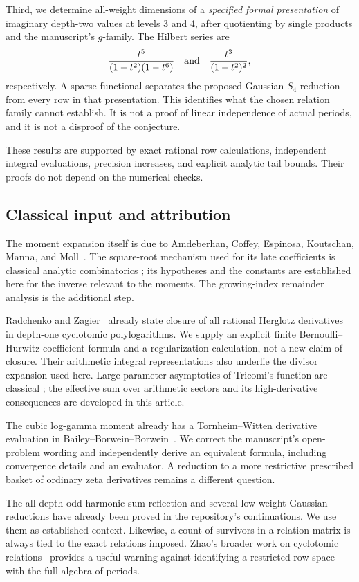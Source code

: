 Third, we determine all-weight dimensions of a \emph{specified formal
presentation} of imaginary depth-two values at levels 3 and 4, after
quotienting by single products and the manuscript's \(g\)-family.
The Hilbert series are
\[
 \frac{t^5}{(1-t^2)(1-t^6)}
 \quad\hbox{and}\quad
 \frac{t^3}{(1-t^2)^2},
\]
respectively. A sparse functional separates the proposed Gaussian
\(S_4\) reduction from every row in that presentation. This identifies
what the chosen relation family cannot establish. It is not a proof of
linear independence of actual periods, and it is not a disproof of the
conjecture.

These results are supported by exact rational row calculations,
independent integral evaluations, precision increases, and explicit
analytic tail bounds. Their proofs do not depend on the numerical
checks.

\subsection{Classical input and attribution}

The moment expansion itself is due to Amdeberhan, Coffey, Espinosa,
Koutschan, Manna, and Moll~\cite{ACEMKM}. The square-root mechanism used
for its late coefficients is classical analytic combinatorics
\cite{FS}; its hypotheses and the constants are established here for
the inverse relevant to the moments. The growing-index remainder
analysis is the additional step.

Radchenko and Zagier~\cite{RZ} already state closure of all rational
Herglotz derivatives in depth-one cyclotomic polylogarithms. We supply
an explicit finite Bernoulli--Hurwitz coefficient formula and a
regularization calculation, not a new claim of closure. Their arithmetic
integral representations also underlie the divisor expansion used here.
Large-parameter asymptotics of Tricomi's function are classical
\cite{DLMF,Temme}; the effective sum over arithmetic sectors and its
high-derivative consequences are developed in this article.

The cubic log-gamma moment already has a Tornheim--Witten derivative
evaluation in Bailey--Borwein--Borwein~\cite{BBB}. We correct the
manuscript's open-problem wording and independently derive an equivalent
formula, including convergence details and an evaluator. A reduction to
a more restrictive prescribed basket of ordinary zeta derivatives
remains a different question.

The all-depth odd-harmonic-sum reflection and several low-weight
Gaussian reductions have already been proved in the repository's
continuations. We use them as established context. Likewise, a count of
survivors in a relation matrix is always tied to the exact relations
imposed. Zhao's broader work on cyclotomic relations~\cite{Zhao}
provides a useful warning against identifying a restricted row space
with the full algebra of periods.

